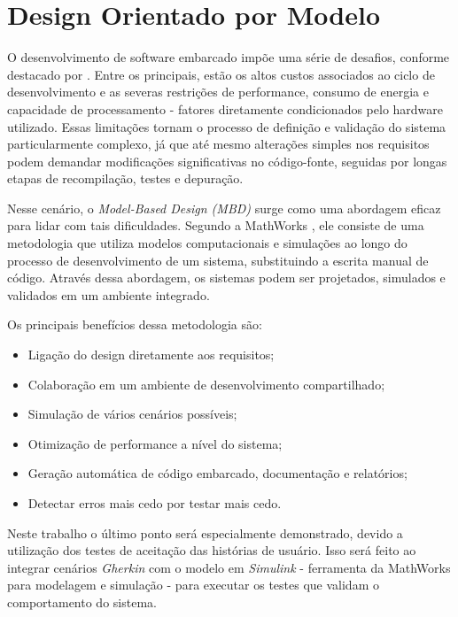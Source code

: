 
\section{\textbf{Design Orientado por Modelo}}
O desenvolvimento de software embarcado impõe uma série de desafios, conforme destacado por . Entre os principais, estão os altos custos associados 
ao ciclo de desenvolvimento e as severas restrições de performance, consumo de energia e capacidade de processamento - fatores diretamente condicionados pelo 
hardware utilizado. Essas limitações tornam o processo de definição e validação do sistema particularmente complexo, já que até mesmo alterações simples nos 
requisitos podem demandar modificações significativas no código-fonte, seguidas por longas etapas de recompilação, testes e depuração.

Nesse cenário, o \textit{Model-Based Design (MBD)} surge como uma abordagem eficaz para lidar com tais dificuldades. Segundo a MathWorks \cite{mathworksMBD2024}, ele 
consiste de uma metodologia que utiliza modelos computacionais e simulações ao longo do processo de desenvolvimento de um sistema, substituindo a escrita manual 
de código. Através dessa abordagem, os sistemas podem ser projetados, simulados e validados em um ambiente integrado.

Os principais benefícios dessa metodologia são:

\begin{itemize}
	\item Ligação do design diretamente aos requisitos;
	\item Colaboração em um ambiente de desenvolvimento compartilhado;
	\item Simulação de vários cenários possíveis;
	\item Otimização de performance a nível do sistema;
	\item Geração automática de código embarcado, documentação e relatórios;
	\item Detectar erros mais cedo por testar mais cedo.
\end{itemize}

Neste trabalho o último ponto será especialmente demonstrado, devido a utilização dos testes de aceitação das histórias de usuário. Isso será feito ao integrar 
cenários \textit{Gherkin} com o modelo em \textit{Simulink} - ferramenta da MathWorks para modelagem e simulação - para executar os testes que validam o comportamento do sistema.

